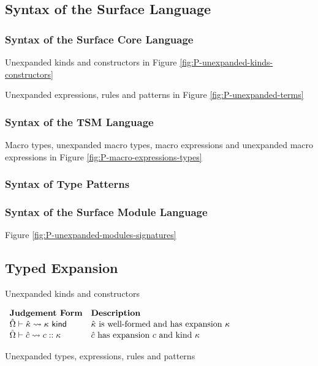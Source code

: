 \subsection{Syntax of the Surface Language}
\subsubsection{Syntax of the Surface Core Language}
Unexpanded kinds and constructors in Figure \ref{fig:P-unexpanded-kinds-constructors}

Unexpanded expressions, rules and patterns in Figure \ref{fig:P-unexpanded-terms}
\subsubsection{Syntax of the TSM Language}
Macro types, unexpanded macro types, macro expressions and unexpanded macro expressions in Figure \ref{fig:P-macro-expressions-types}
\subsubsection{Syntax of Type Patterns}
\subsubsection{Syntax of the Surface Module Language}
Figure \ref{fig:P-unexpanded-modules-signatures}

\subsection{Typed Expansion}
Unexpanded kinds and constructors

\vspace{10px}
$\begin{array}{ll}
\textbf{Judgement Form} & \textbf{Description}\\
{\hat\Omega} \vdash {\hat\kappa} \leadsto \kappa~\mathsf{kind} & \text{${\hat\kappa}$ is well-formed and has expansion $\kappa$}\\
{\hat\Omega} \vdash {\hat c} \leadsto c :: \kappa & \text{${\hat c}$ has expansion $c$ and kind $\kappa$}
\end{array}$
\vspace{10px}

Unexpanded types, expressions, rules and patterns

